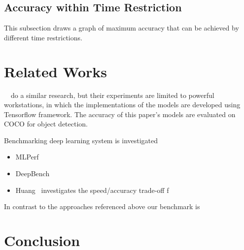 \documentclass[conference]{IEEEtran}
\begin{document}
\subsection{Accuracy within Time Restriction}
This subsection draws a graph of maximum accuracy that can be achieved by different time restrictions. 

\section{Related Works}
~\cite{huang2017speed}~do a similar research, but their experiments are limited to powerful workstations, in which the implementations of the models are developed using Tensorflow framework. The accuracy of this paper's models are evaluated on COCO for object detection.

Benchmarking deep learning system is investigated

\begin{itemize}
    \item MLPerf
    \item DeepBench
    \item Huang~\cite{DBLP:journals/corr/HuangRSZKFFWSG016} investigates the speed/accuracy trade-off f
\end{itemize}

In contrast to the approaches referenced above our benchmark is 


\section{Conclusion}



%





\end{document}
